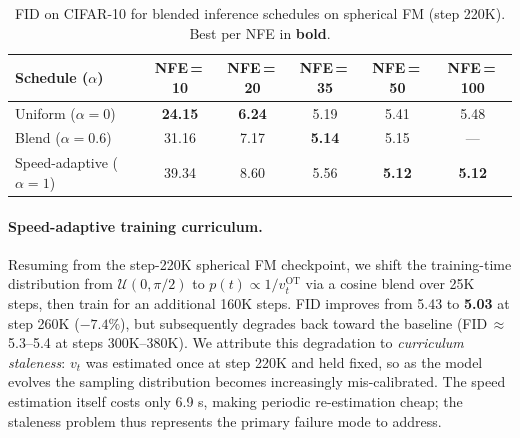 \begin{table}[h]
\centering
\small
\caption{FID on CIFAR-10 for blended inference schedules on spherical FM (step 220K). Best per NFE in \textbf{bold}.}
\label{tab:sph_schedule}
\begin{tabular}{lccccc}
\toprule
Schedule ($\alpha$) & NFE\,=\,10 & NFE\,=\,20 & NFE\,=\,35 & NFE\,=\,50 & NFE\,=\,100 \\
\midrule
Uniform ($\alpha\!=\!0$)    & \textbf{24.15} & \textbf{6.24} & 5.19 & 5.41 & 5.48 \\
Blend ($\alpha\!=\!0.6$)    & 31.16          & 7.17          & \textbf{5.14} & 5.15 & — \\
Speed-adaptive ($\alpha\!=\!1$) & 39.34      & 8.60          & 5.56 & \textbf{5.12} & \textbf{5.12} \\
\bottomrule
\end{tabular}
\end{table}

\paragraph{Speed-adaptive training curriculum.}
Resuming from the step-220K spherical FM checkpoint, we shift the training-time distribution from $\mathcal{U}(0, \pi/2)$ to $p(t) \propto 1/v_t^{\mathrm{OT}}$ via a cosine blend over 25K steps, then train for an additional 160K steps.
FID improves from 5.43 to \textbf{5.03} at step 260K ($-7.4\%$), but subsequently degrades back toward the baseline (FID\,$\approx$\,5.3--5.4 at steps 300K--380K).
We attribute this degradation to \emph{curriculum staleness}: $v_t$ was estimated once at step 220K and held fixed, so as the model evolves the sampling distribution becomes increasingly mis-calibrated.
The speed estimation itself costs only 6.9 s, making periodic re-estimation cheap; the staleness problem thus represents the primary failure mode to address.

